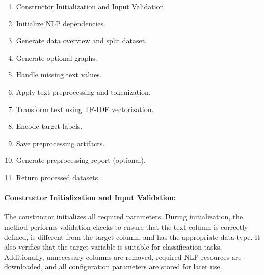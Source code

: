 \begin{enumerate}
  \item Constructor Initialization and Input Validation.
  \item Initialize NLP dependencies.
  \item Generate data overview and split dataset.
  \item Generate optional graphs.
  \item Handle missing text values.
  \item Apply text preprocessing and tokenization.
  \item Transform text using TF-IDF vectorization.
  \item Encode target labels.
  \item Save preprocessing artifacts.
  \item Generate preprocessing report (optional).
  \item Return processed datasets.
\end{enumerate}
\vspace{1cm}
\vspace{0.5cm}
\paragraph{Constructor Initialization and Input Validation:}\par

The constructor initializes all required parameters. During initialization, the method performs  validation checks to ensure that the text column is correctly defined, is different from the target column, and has the appropriate data type. It also verifies that the target variable is suitable for classification tasks. Additionally, unnecessary columns are removed, required NLP resources are downloaded, and all configuration parameters are stored for later use.

